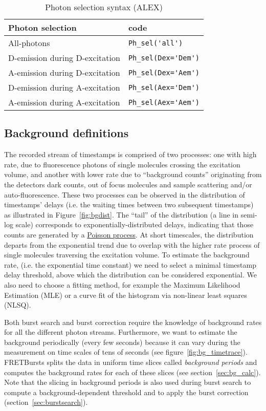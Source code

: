 \begin{table}
\begin{tabular}{l|l}
  Photon selection  & code \\
  \hline
  All-photons & \verb|Ph_sel('all')|\\
  D-emission during D-excitation & \verb|Ph_sel(Dex='Dem')|\\
  A-emission during D-excitation & \verb|Ph_sel(Dex='Aem')|\\
  D-emission during A-excitation & \verb|Ph_sel(Aex='Dem')|\\
  A-emission during A-excitation & \verb|Ph_sel(Aex='Aem')|\\
\end{tabular}
\caption{\label{tab:ph_sel_alex}Photon selection syntax (ALEX)}
\end{table}

\subsection{Background definitions}
\label{sec:bg_intro}

The recorded stream of timestamps is comprised of two processes: one with 
high rate, due to fluorescence photons of single molecules crossing the 
excitation volume, and another with lower rate due to “background
counts” originating from the detectors dark counts, out of focus molecules
and sample scattering and/or auto-fluorescence\cite{Gopich_2008}. 
These two processes can be 
observed in the distribution of timestamps' delays (i.e. the waiting times 
between two subsequent timestamps) as illustrated in Figure~\ref{fig:bgdist}.
The “tail” of the distribution (a line in semi-log scale) corresponds 
to exponentially-distributed delays, indicating that those counts are generated by a
\href{http://en.wikipedia.org/wiki/Poisson_process}{Poisson process}. At short
timescales, the distribution departs from the exponential trend due to overlap with the higher rate process of single molecules traversing the excitation volume. To estimate the background
rate, (i.e. the exponential time constant) we need to select a minimal
timestamp delay threshold, above which the distribution can be considered exponential. We also need to choose a fitting method, for example the Maximum
Likelihood Estimation (MLE) or a curve fit of the histogram via non-linear
least squares (NLSQ).

Both burst search and burst correction require the knowledge of background rates for all the
different photon streams. Furthermore, we want to estimate the background
periodically (every few seconds) because it can vary during the measurement on
time scales of tens of seconds (see figure~\ref{fig:bg_timetrace}). FRETBursts splits the data in uniform time
slices called \textit{background periods} and computes the background rates for
each of these slices (see section~\ref{sec:bg_calc}). Note that the slicing 
in background
periods is also used during burst search to compute a background-dependent
threshold and to apply the burst correction (section~\ref{sec:burstsearch}).

